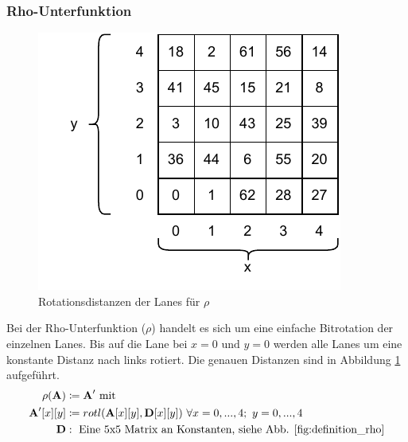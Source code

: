 \subsubsection{Rho-Unterfunktion}
\begin{figure}
    \center
    \includegraphics{images/rho.pdf}
    \caption{Rotationsdistanzen der Lanes für $\rho$}
    \label{fig:definition_rho}
\end{figure}
Bei der Rho-Unterfunktion ($\rho$) handelt es sich um eine einfache Bitrotation der einzelnen Lanes.
Bis auf die Lane bei $x=0 \text{ und } y=0$ werden alle Lanes um eine konstante Distanz nach links rotiert.
Die genauen Distanzen sind in Abbildung \ref{fig:definition_rho} aufgeführt.
\begin{align*}
    \rho (\textbf{A}) & \coloneq \textbf{A}^\prime \text{ mit } \\
    \textbf{A}^\prime[x][y] & \coloneq rotl(\textbf{A}[x][y], \textbf{D}[x][y])\ \forall x = 0,...,4;\ y = 0,...,4 \\
    \textbf{D} & :\text{ Eine 5x5 Matrix an Konstanten, siehe Abb. \ref{fig:definition_rho}}
\end{align*}

